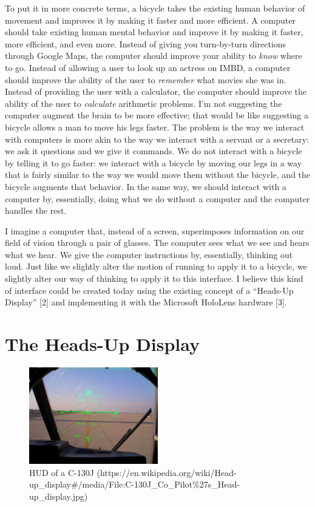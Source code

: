 \documentclass[a4paper,12pt]{article}
\begin{document}
To put it in more concrete terms, a bicycle takes the existing human behavior of movement and improves it by making it faster and more efficient. A computer should take existing human mental behavior and improve it by making it faster, more efficient, and even more. Instead of giving you turn-by-turn directions through Google Maps, the computer should improve your ability to \emph{know} where to go. Instead of allowing a user to look up an actress on IMBD, a computer should improve the ability of the user to \emph{remember} what movies she was in. Instead of providing the user with a calculator, the computer should improve the ability of the user to \emph{calculate} arithmetic problems. I'm not suggesting the computer augment the brain to be more effective; that would be like suggesting a bicycle allows a man to move his legs faster. The problem is the way we interact with computers is more akin to the way we interact with a servant or a secretary: we ask it questions and we give it commands. We do not interact with a bicycle by telling it to go faster: we interact with a bicycle by moving our legs in a way that is fairly similar to the way we would move them without the bicycle, and the bicycle augments that behavior. In the same way, we should interact with a computer by, essentially, doing what we do without a computer and the computer handles the rest.

I imagine a computer that, instead of a screen, superimposes information on our field of vision through a pair of glasses. The computer sees what we see and hears what we hear. We give the computer instructions by, essentially, thinking out loud. Just like we slightly alter the motion of running to apply it to a bicycle, we slightly alter our way of thinking to apply it to this interface. I believe this kind of interface could be created today using the existing concept of a ``Heads-Up Display'' [2] and implementing it with the Microsoft HoloLens hardware [3].

\section{The Heads-Up Display}

\begin{figure}
\centering
\includegraphics[width=0.5\textwidth]{jethud}
\caption{HUD of a C-130J (https://en.wikipedia.org/wiki/Head-up\_display\#/media/File:C-130J\_Co\_Pilot\%27s\_Head-up\_display.jpg)}
\end{figure}
\end{document}
